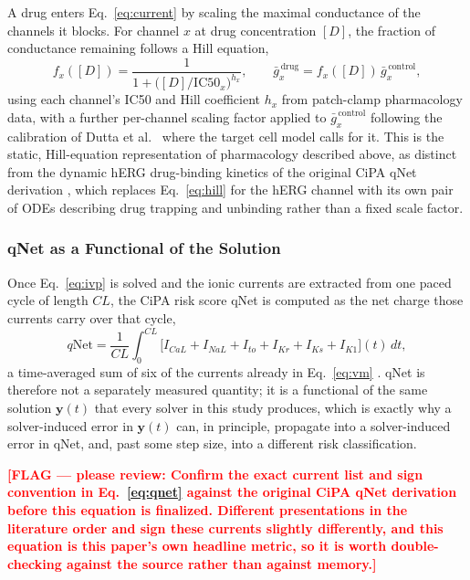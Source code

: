 \documentclass[journal]{IEEEtran}
\newcommand{\flag}[1]{\textcolor{red}{\textbf{[FLAG --- please review: #1]}}}
\begin{document}
A drug enters Eq.~\eqref{eq:current} by scaling the maximal conductance of the channels it blocks. For channel $x$ at drug concentration $[D]$, the fraction of conductance remaining follows a Hill equation,
\begin{equation}
f_x([D]) = \frac{1}{1 + \big([D]/\mathrm{IC50}_x\big)^{h_x}}, \qquad \bar{g}_x^{\,\text{drug}} = f_x([D])\,\bar{g}_x^{\,\text{control}},
\label{eq:hill}
\end{equation}
using each channel's IC50 and Hill coefficient $h_x$ from patch-clamp pharmacology data, with a further per-channel scaling factor applied to $\bar{g}_x^{\,\text{control}}$ following the calibration of Dutta et al.\ \cite{dutta2017} where the target cell model calls for it. This is the static, Hill-equation representation of pharmacology described above, as distinct from the dynamic hERG drug-binding kinetics of the original CiPA qNet derivation \cite{li2017}, which replaces Eq.~\eqref{eq:hill} for the hERG channel with its own pair of ODEs describing drug trapping and unbinding rather than a fixed scale factor.

\subsubsection{qNet as a Functional of the Solution}

Once Eq.~\eqref{eq:ivp} is solved and the ionic currents are extracted from one paced cycle of length $CL$, the CiPA risk score qNet is computed as the net charge those currents carry over that cycle,
\begin{equation}
q\mathrm{Net} = \frac{1}{CL}\int_0^{CL} \Big[I_{CaL} + I_{NaL} + I_{to} + I_{Kr} + I_{Ks} + I_{K1}\Big](t)\, dt,
\label{eq:qnet}
\end{equation}
a time-averaged sum of six of the currents already in Eq.~\eqref{eq:vm} \cite{li2017}. qNet is therefore not a separately measured quantity; it is a functional of the same solution $\mathbf{y}(t)$ that every solver in this study produces, which is exactly why a solver-induced error in $\mathbf{y}(t)$ can, in principle, propagate into a solver-induced error in qNet, and, past some step size, into a different risk classification.

\flag{Confirm the exact current list and sign convention in Eq.~\eqref{eq:qnet} against the original CiPA qNet derivation \cite{li2017} before this equation is finalized. Different presentations in the literature order and sign these currents slightly differently, and this equation is this paper's own headline metric, so it is worth double-checking against the source rather than against memory.}
\end{document}
